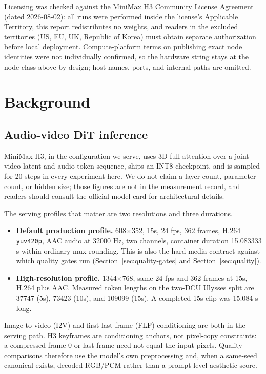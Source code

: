 \documentclass[11pt]{article}
\begin{document}
Licensing was checked against the MiniMax H3 Community License Agreement (dated 2026-08-02): all runs were performed inside the license's Applicable Territory, this report redistributes no weights, and readers in the excluded territories (US, EU, UK, Republic of Korea) must obtain separate authorization before local deployment. Compute-platform terms on publishing exact node identities were not individually confirmed, so the hardware string stays at the node class above by design; host names, ports, and internal paths are omitted.

\section{Background}
\label{sec:background}

\subsection{Audio-video DiT inference}
\label{sec:avdit}

MiniMax H3, in the configuration we serve, uses 3D full attention over a joint video-latent and audio-token sequence, ships an INT8 checkpoint, and is sampled for 20 steps in every experiment here. We do not claim a layer count, parameter count, or hidden size; those figures are not in the measurement record, and readers should consult the official model card for architectural details.

The serving profiles that matter are two resolutions and three durations.

\begin{itemize}
\item \textbf{Default production profile.} 608$\times$352, 15s, 24 fps, 362 frames, H.264 \texttt{yuv420p}, AAC audio at 32000 Hz, two channels, container duration 15.083333 s within ordinary mux rounding. This is also the hard media contract against which quality gates run (Section~\ref{sec:quality-gates} and Section~\ref{sec:quality}).
\item \textbf{High-resolution profile.} 1344$\times$768, same 24 fps and 362 frames at 15s, H.264 plus AAC. Measured token lengths on the two-DCU Ulysses split are 37747 (5s), 73423 (10s), and 109099 (15s). A completed 15s clip was 15.084 s long.
\end{itemize}

Image-to-video (I2V) and first-last-frame (FLF) conditioning are both in the serving path. H3 keyframes are conditioning anchors, not pixel-copy constraints: a compressed frame 0 or last frame need not equal the input pixels. Quality comparisons therefore use the model's own preprocessing and, when a same-seed canonical exists, decoded RGB/PCM rather than a prompt-level aesthetic score.
\end{document}

